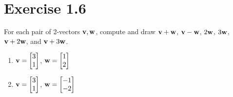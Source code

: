 \section*{Exercise 1.6}
\begin{exercise}
For each pair of 2-vectors $\mathbf{v}, \mathbf{w}$, compute and draw
$\mathbf{v}+\mathbf{w}$, $\mathbf{v}-\mathbf{w}$, $2\mathbf{w}$, $3\mathbf{w}$,
$\mathbf{v}+2\mathbf{w}$, and $\mathbf{v}+3\mathbf{w}$.
\begin{enumerate}
  \item $\mathbf{v} = \begin{bmatrix} 3 \\ 1 \end{bmatrix}$,
        $\mathbf{w} = \begin{bmatrix} 1 \\ 2 \end{bmatrix}$
  \item $\mathbf{v} = \begin{bmatrix} 3 \\ 1 \end{bmatrix}$,
        $\mathbf{w} = \begin{bmatrix} -1 \\ -2 \end{bmatrix}$
\end{enumerate}
\end{exercise}

